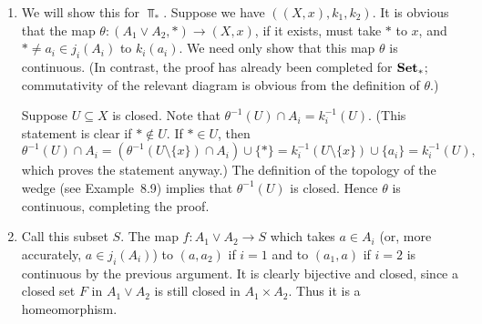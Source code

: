 \documentclass[../../solutions.tex]{subfiles}
\begin{document}
\begin{exercise} \leavevmode
\begin{enumerate}
\item
We will show this for $\Top_*$.
Suppose we have $((X,x),k_1,k_2)$.
It is obvious that the map $\theta:(A_1\vee A_2,*)\to(X,x)$, if it exists, must take $*$ to $x$, and $*\ne a_i\in j_i(A_i)$ to $k_i(a_i)$.
We need only show that this map $\theta$ is continuous.
(In contrast, the proof has already been completed for $\mathbf{Set}_*$; commutativity of the relevant diagram is obvious from the definition of $\theta$.)

Suppose $U\subseteq X$ is closed.
Note that $\theta^{-1}(U)\cap A_i=k_i^{-1}(U)$.
(This statement is clear if $*\not\in U$.
If $*\in U$, then
\[\theta^{-1}(U)\cap A_i=(\theta^{-1}(U\setminus\{x\})\cap A_i)\cup\{*\}=k_i^{-1}(U\setminus\{x\})\cup\{a_i\}=k_i^{-1}(U),\]
which proves the statement anyway.)
The definition of the topology of the wedge (see Example~8.9) implies that $\theta^{-1}(U)$ is closed.
Hence $\theta$ is continuous, completing the proof.

\item
Call this subset $S$.
The map $f:A_1\vee A_2\to S$ which takes $a\in A_i$ (or, more accurately, $a\in j_i(A_i)$) to $(a,a_2)$ if $i=1$ and to $(a_1,a)$ if $i=2$ is continuous by the previous argument.
It is clearly bijective and closed, since a closed set $F$ in $A_1\vee A_2$ is still closed in $A_1\times A_2$.
Thus it is a homeomorphism.
\end{enumerate}
\end{exercise}
\end{document}
